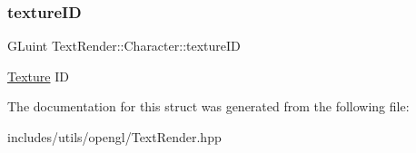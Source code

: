 \subsubsection{\texorpdfstring{texture\+ID}{textureID}}
{\footnotesize\ttfamily G\+Luint Text\+Render\+::\+Character\+::texture\+ID}

\hyperlink{struct_texture}{Texture} ID 

The documentation for this struct was generated from the following file\+:\begin{DoxyCompactItemize}
\item 
includes/utils/opengl/Text\+Render.\+hpp\end{DoxyCompactItemize}
